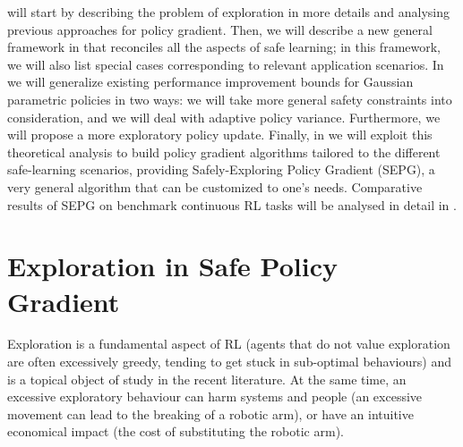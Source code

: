  will start by describing the problem of exploration in more details and analysing previous approaches for policy gradient. Then, we will describe a new general framework in  that reconciles all the aspects of safe learning; in this framework, we will also list special cases corresponding to relevant application scenarios. In  we will generalize existing performance improvement bounds for Gaussian parametric policies in two ways: we will take more general safety constraints into consideration, and we will deal with adaptive policy variance. Furthermore, we will propose a more exploratory policy update. Finally, in  we will exploit this theoretical analysis to build policy gradient algorithms tailored to the different safe-learning scenarios, providing Safely-Exploring Policy Gradient (SEPG), a very general algorithm that can be customized to one's needs. Comparative results of SEPG on benchmark continuous RL tasks will be analysed in detail in .

\section{Exploration in Safe Policy Gradient}\label{sec:sepg-intro}
Exploration is a fundamental aspect of RL (agents that do not value exploration are often excessively greedy, tending to get stuck in sub-optimal behaviours) and is a topical object of study in the recent literature. At the same time, an excessive exploratory behaviour can harm systems and people (\eg an excessive movement can lead to the breaking of a robotic arm), or have an intuitive economical impact (\eg the cost of substituting the robotic arm).

